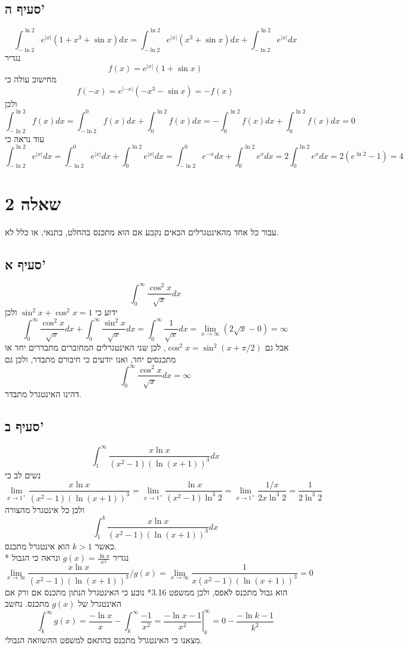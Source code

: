 \subsection{סעיף ה'}
\[
	\int_{-\ln 2}^{\ln 2} e^{|x|} (1 + x^3 + \sin x) dx
	= \int_{-\ln 2}^{\ln 2} e^{|x|} (x^3 + \sin x) dx
	+ \int_{-\ln 2}^{\ln 2} e^{|x|} dx
\]
נגדיר
\[
	f(x) = e^{|x|} (1 + \sin x)
\]
מחישוב עולה כי
\[
	f(-x) = e^{|-x|} (-x^3 - \sin x) = - f(x)
\]
ולכן
\[
	\int_{-\ln 2}^{\ln 2} f(x) dx
	= \int_{-\ln 2}^{0} f(x) dx + \int_{0}^{\ln 2} f(x) dx
	= -\int_{0}^{\ln 2} f(x) dx + \int_{0}^{\ln 2} f(x) dx
	= 0
\]
עוד נראה כי
\[
	\int_{-\ln 2}^{\ln 2} e^{|x|} dx
	= \int_{-\ln 2}^{0} e^{|x|} dx + \int_{0}^{\ln 2} e^{|x|} dx
	= \int_{-\ln 2}^{0} e^{-x} dx + \int_{0}^{\ln 2} e^{x} dx
	= 2\int_{0}^{\ln 2} e^{x} dx
	= 2 (e^{\ln 2} - 1) = 4
\]

\section{שאלה 2}
עבור כל אחד מהאינטגרלים הבאים נקבע אם הוא מתכנס בהחלט, בתנאי, או כלל לא.

\subsection{סעיף א'}
\[
	\int_0^\infty \frac{\cos^2 x}{\sqrt{x}}dx
\]
ידוע כי $\sin^2 x + \cos^2 x = 1$ ולכן
\[
	\int_0^\infty \frac{\cos^2 x}{\sqrt{x}}dx + \int_0^\infty \frac{\sin^2 x}{\sqrt{x}}dx
	= \int_0^\infty \frac{1}{\sqrt{x}}dx
	= \lim_{x \to \infty} (2\sqrt{x} - 0)
	= \infty
\]
אבל גם $\cos^2x = \sin^2(x + \pi/2)$, לכן שני האינטגרלים המחוברים מתבדרים יחד או מתכנסים יחד, ואנו יודעים כי חיבורם מתבדר, ולכן גם
\[
	\int_0^\infty \frac{\cos^2 x}{\sqrt{x}}dx = \infty
\]
דהינו האינטגרל מתבדר.

\subsection{סעיף ב'}
\[
	\int_1^\infty \frac{x \ln x}{(x^2 - 1){(\ln(x + 1))}^3} dx
\]
נשים לב כי
\[
	\lim_{x \to 1^+} \frac{x \ln x}{(x^2 - 1){(\ln(x + 1))}^3} 
	= \lim_{x \to 1^+} \frac{\ln x}{(x^2 - 1) \ln^3 2} 
	= \lim_{x \to 1^+} \frac{1/x}{2x \ln^3 2} 
	= \frac{1}{2\ln^3 2} 
\]
ולכן כל אינטגרל מהצורה
\[
	\int_1^k \frac{x \ln x}{(x^2 - 1){(\ln(x + 1))}^3} dx
\]
כאשר $k > 1$ הוא אינטגרל מתכנס. \\*
נגדיר $g(x) = \frac{\ln x}{x^2}$ ונראה כי הגבול
\[
	\lim_{x \to \infty} \frac{x \ln x}{(x^2 - 1){(\ln(x + 1))}^3}/g(x)
	= \lim_{x \to \infty} \frac{1}{x(x^2 - 1){(\ln(x + 1))}^3}
	= 0
\]
הוא גבול מתכנס לאפס,
ולכן ממשפט 3.16* נובע כי האינטגרל הנתון מתכנס אם ורק אם האינטגרל של $g(x)$ מתכנס. נחשב
\[
	\int_{k}^{\infty} g(x)
	= \frac{-\ln x}{x} - \int_{k}^{\infty} \frac{-1}{x^2}
	= \left. \frac{-\ln x - 1}{x^2} \right|_k^\infty
	= 0 - \frac{-\ln k - 1}{k^2}
\]
מצאנו כי האינטגרל מתכנס בהתאם למשפט ההשוואה הגבולי.

